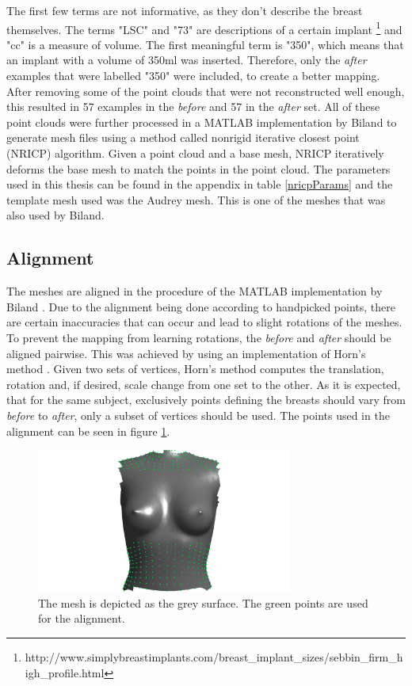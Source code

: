 The first few terms are not informative, as they don't describe the breast themselves. The terms "LSC" and "73" are descriptions of a certain implant \footnote{http://www.simplybreastimplants.com/breast\_implant\_sizes/sebbin\_firm\_high\_profile.html} and "cc" is a measure of volume. The first meaningful term is "350", which means that an implant with a volume of 350ml was inserted. Therefore, only the \textit{after} examples that were labelled "350" were included, to create a better mapping. After removing some of the point clouds that were not reconstructed well enough, this resulted in 57 examples in the \textit{before} and 57 in the \textit{after} set. All of these point clouds were further processed in a MATLAB implementation by Biland \cite{Biland17} to generate mesh files using a method called nonrigid iterative closest point (NRICP) algorithm. Given a point cloud and a base mesh, NRICP iteratively deforms the base mesh to match the points in the point cloud. The parameters used in this thesis can be found in the appendix in table \ref{nricpParams} and the template mesh used was the Audrey mesh. This is one of the meshes that was also used by Biland.

\subsection{Alignment}
\label{align}
The meshes are aligned in the procedure of the MATLAB implementation by Biland \cite{Biland17}. Due to the alignment being done according to handpicked points, there are certain inaccuracies that can occur and lead to slight rotations of the meshes. To prevent the mapping from learning rotations, the \textit{before} and \textit{after} should be aligned pairwise. This was achieved by using an implementation of Horn's method \cite{horn1987closed}. Given two sets of vertices, Horn's method computes the translation, rotation and, if desired, scale change from one set to the other. As it is expected, that for the same subject, exclusively points defining the breasts should vary from \textit{before} to \textit{after}, only a subset of vertices should be used. The points used in the alignment can be seen in figure \ref{fig:alignment}.

\begin{figure}[h]
\centering
\includegraphics[width=0.75\textwidth]{figures/alignment}
\caption[Alignment points visualized]{The mesh is depicted as the grey surface. The green points are used for the alignment.}
\label{fig:alignment}
\end{figure}

